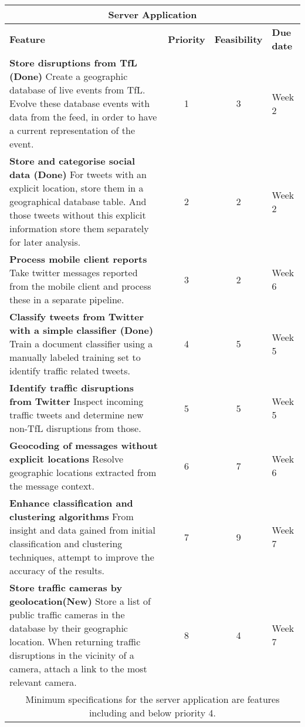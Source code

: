 \begin{center}
\begin{tabular}{ | p{9cm} | c | c | p{1.8cm} | }
\hline
\multicolumn{4}{|c|}{\textbf{Server Application}} \\ \hline
\textbf{Feature} & \textbf{Priority} & \textbf{Feasibility} & \textbf{Due date}
\\ \hline
\textbf{Store disruptions from TfL (Done)} \newline
Create a geographic database of live events from TfL. Evolve these database events with data from the feed, in order to have a current representation of the event. & 1 & 3 & Week 2 \\ \hline
\textbf{Store and categorise social data (Done)} \newline
For tweets with an explicit location, store them in a geographical database
table. And those tweets without this explicit information store them separately for later
analysis. & 2 & 2 & Week 2 \\ \hline
\textbf{Process mobile client reports} \newline
Take twitter messages reported from the mobile client and process these in a
separate pipeline. & 3 & 2 & Week 6 \\ \hline
\textbf{Classify tweets from Twitter with a simple classifier (Done)} \newline
Train a document classifier using a manually labeled training set to 
identify traffic related tweets. & 4 & 5 & Week 5 \\ \hline
\textbf{Identify traffic disruptions from Twitter} \newline
Inspect incoming traffic tweets and determine new non-TfL disruptions from
those. & 5 & 5 & Week 5 \\ \hline
\textbf{Geocoding of messages without explicit locations} \newline
Resolve geographic locations extracted from the message context. & 6 & 7 & Week 6 \\ \hline
\textbf{Enhance classification and clustering algorithms} \newline
From insight and data gained from initial classification and clustering
techniques, attempt to improve the accuracy of the results. & 7 & 9 & Week 7 \\ \hline
\textbf{Store traffic cameras by geolocation(New)}\newline
Store a list of public traffic cameras in the database by their geographic
location. When returning traffic disruptions in the vicinity of a camera,
attach a link to the most relevant camera. &  8 &  4 & Week 7 \\ \hline
\multicolumn{4}{|c|}{Minimum specifications for the server application are
features including and below priority 4.} \\ \hline
\end{tabular}
\end{center}